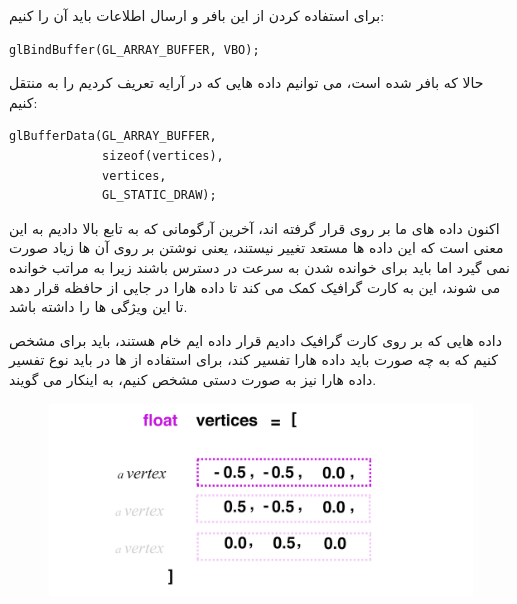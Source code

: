 \documentclass[a4paper, 12pt]{report}
\newcommand{\lrit}[1]{\lr{\textit{#1}}}
\begin{document}
    برای استفاده کردن از این بافر و ارسال اطلاعات باید آن را  کنیم:
    \begin{LTR}
    \small
        \begin{lstlisting}[style=C++Style,caption=\lrit{binding to target gl\_array\_buffer}]
glBindBuffer(GL_ARRAY_BUFFER, VBO);
        \end{lstlisting}
    \end{LTR}
    \normalsize
    \vspace*{0.3cm}

    حالا که بافر  شده است، می توانیم داده هایی که در آرایه  تعریف کردیم را به  منتقل کنیم:
        \begin{LTR}
    \small
        \begin{lstlisting}[style=C++Style,caption=\lrit{uploading data for static draw}]
glBufferData(GL_ARRAY_BUFFER,
             sizeof(vertices),
             vertices,
             GL_STATIC_DRAW);
        \end{lstlisting}
    \end{LTR}
    \normalsize
    \vspace*{0.3cm}

    اکنون داده های ما بر روی  قرار گرفته اند، آخرین آرگومانی که به تابع بالا دادیم به این معنی است که این داده ها مستعد تغییر نیستند، یعنی نوشتن بر روی آن ها زیاد صورت نمی گیرد اما باید برای خوانده شدن به سرعت در دسترس باشند زیرا به مراتب خوانده می شوند، این به کارت گرافیک کمک می کند تا داده هارا در جایی از حافظه قرار دهد تا این ویژگی ها را داشته باشد.

    داده هایی که بر روی کارت گرافیک دادیم قرار داده ایم خام هستند، باید برای  مشخص کنیم که به چه صورت باید داده هارا تفسیر کند، برای استفاده از  ها در  باید نوع تفسیر داده هارا نیز به صورت دستی مشخص کنیم، به اینکار  می گویند.

    \vspace*{0.6cm}
\begin{figure}[ht]
    \centering
    \href{https://learnopengl.com}{
        \includegraphics[width=12cm]{images/shm-linking-vertex-attribute.png}
    }
    \caption{\fontsize{11pt}{1.0cm}\zarbold\textbf{}}
    \label{fig:my_label}
\end{figure}
\vspace*{0.6cm}
\end{document}
